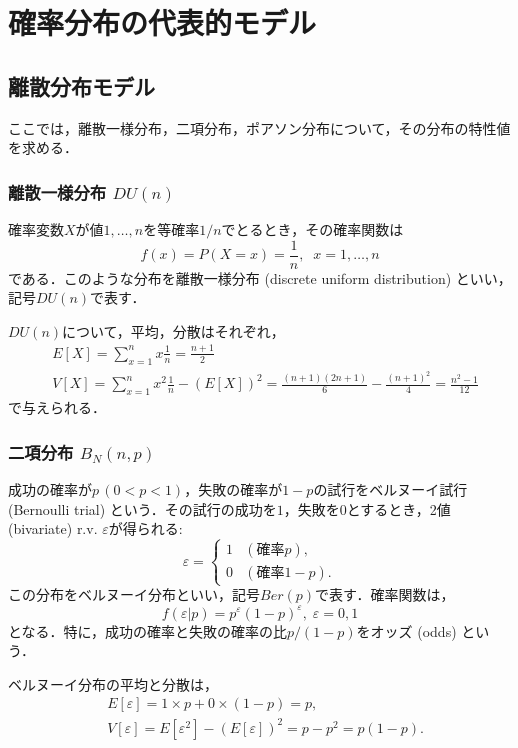 \documentclass{jsreport}
\begin{document}
\chapter{確率分布の代表的モデル}
\section{離散分布モデル}
ここでは，離散一様分布，二項分布，ポアソン分布について，その分布の特性値を求める．
\subsection{離散一様分布 $DU(n)$}
確率変数$X$が値$1, \ldots, n$を等確率$1/n$でとるとき，その確率関数は
\begin{equation}
  f(x) = P(X = x) = \frac{1}{n}, \; \; x = 1, \ldots, n \nonumber
\end{equation}
である．このような分布を離散一様分布 (discrete uniform distribution) といい，記号$DU(n)$で表す．

$DU(n)$について，平均，分散はそれぞれ，
\begin{align}
  &E[X] = \sum_{x = 1}^n x \frac{1}{n} = \frac{n + 1}{2} \nonumber \\
  &V[X] = \sum_{x = 1}^n x^2 \frac{1}{n} - (E[X])^2 = \frac{(n + 1)(2n + 1)}{6} - \frac{(n + 1)^2}{4} = \frac{n^2 - 1}{12} \nonumber
\end{align}
で与えられる．

\subsection{二項分布 $B_N(n, p)$}
成功の確率が$p \, (0 < p < 1)$，失敗の確率が$1 - p$の試行をベルヌーイ試行 (Bernoulli trial) という．その試行の成功を$1$，失敗を$0$とするとき，2値 (bivariate) r.v. $\varepsilon$が得られる:
\begin{equation}
  \varepsilon = \begin{cases}
    1 & (確率p), \\
    0 & (確率1 - p).
\end{cases}\nonumber
\end{equation}
この分布をベルヌーイ分布といい，記号$Ber(p)$で表す．確率関数は，
\begin{equation}
  f(\varepsilon | p) = p^{\varepsilon} (1 - p)^{\varepsilon}, \; \varepsilon = 0, 1 \nonumber
\end{equation}
となる．特に，成功の確率と失敗の確率の比$p/(1-p)$をオッズ (odds) という．

ベルヌーイ分布の平均と分散は，
\begin{align}
  &E[\varepsilon] = 1 \times p + 0 \times (1 - p) = p, \nonumber \\
  &V[\varepsilon] = E[\varepsilon^2] - (E[\varepsilon])^2 = p - p^2 = p(1 - p). \nonumber
\end{align}
\end{document}
